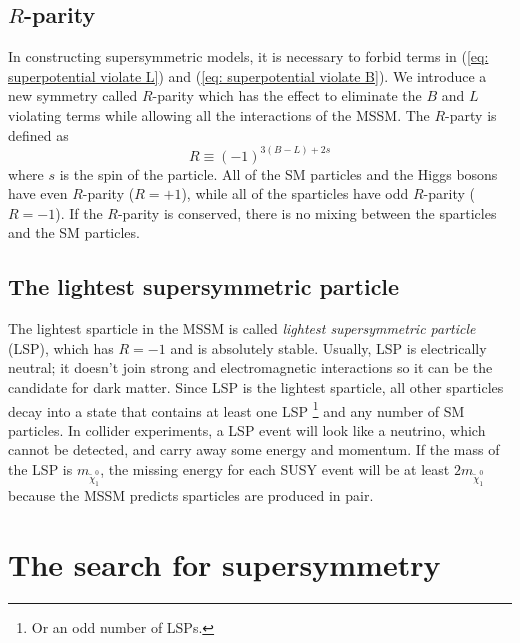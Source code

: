 \documentclass[12pt]{report}
\begin{document}
\section{$R$-parity}
In constructing supersymmetric models, it is necessary to forbid terms in (\ref{eq: superpotential violate L}) and (\ref{eq: superpotential violate B}).
We introduce a new symmetry called $R$-parity which has the effect to eliminate the $B$ and $L$ violating terms while allowing all the interactions of the MSSM.
The $R$-party is defined as
\begin{equation}
R \equiv (-1)^{3(B - L) + 2s}
\end{equation}
where $s$ is the spin of the particle. All of the SM particles and the Higgs bosons have even $R$-parity ($R = +1$), while all of the sparticles have odd $R$-parity ($R = -1$).
If the $R$-parity is conserved, there is no mixing between the sparticles and the SM particles.



\section{The lightest supersymmetric particle}
The lightest sparticle in the MSSM is called \textit{lightest supersymmetric particle} (LSP), which has $R = -1$ and is absolutely stable.
Usually, LSP is electrically neutral; it doesn't join strong and electromagnetic interactions so it can be the candidate for dark matter.
Since LSP is the lightest sparticle, all other sparticles decay into a state that contains at least one LSP \footnote{Or an odd number of LSPs.} and any number of SM particles.
In collider experiments, a LSP event will look like a neutrino, which cannot be detected, and carry away some energy and momentum.
If the mass of the LSP is $m_{\widetilde{\chi}^{0}_{1}}$, the missing energy for each SUSY event will be at least $2 m_{\widetilde{\chi}^{0}_{1}}$ because the MSSM predicts sparticles are produced in pair.





\chapter{The search for supersymmetry}
\end{document}
